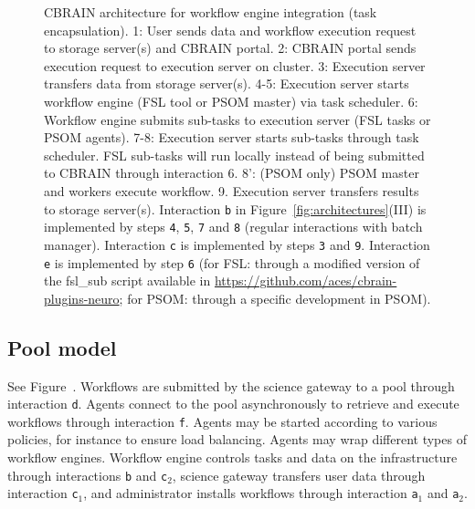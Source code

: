 \documentclass[preprint,3p,twocolumn]{elsarticle}
\begin{document}
\begin{figure}
\centering
{} \hfill {}
\caption{CBRAIN architecture for workflow engine integration
  (task encapsulation).  1: User sends data and workflow execution request to
  storage server(s) and CBRAIN portal. 2: CBRAIN portal sends
  execution request to execution server on cluster. 3: Execution
  server transfers data from storage server(s). 4-5: Execution server
  starts workflow engine (FSL tool or PSOM master) via task
  scheduler. 6: Workflow engine submits sub-tasks to execution server
  (FSL tasks or PSOM agents). 7-8: Execution server starts sub-tasks
  through task scheduler. FSL sub-tasks will run locally
  instead of being submitted to CBRAIN through interaction 6. 8':
  (PSOM only) PSOM master and workers execute workflow. 9. Execution
  server transfers results to storage server(s). Interaction
  \texttt{b} in Figure~\ref{fig:architectures}(III) is implemented by steps
  \texttt{4}, \texttt{5}, \texttt{7} and \texttt{8} (regular
  interactions with batch manager). Interaction \texttt{c} is
  implemented by steps \texttt{3} and \texttt{9}. Interaction
  \texttt{e} is implemented by step \texttt{6} (for FSL: through a
  modified version of the fsl\_sub script available in
  \url{https://github.com/aces/cbrain-plugins-neuro}; for PSOM:
  through a specific development in PSOM).}
\label{fig:cbrain-sub-tasking}
\end{figure}

\subsection{Pool model}
\label{sec:pool}
See Figure~. Workflows are submitted by the science
gateway to a pool through interaction \texttt{d}. Agents connect to
the pool asynchronously to retrieve and execute workflows through
interaction \texttt{f}. Agents may be started according to various
policies, for instance to ensure load balancing. Agents may wrap
different types of workflow engines. Workflow engine controls tasks
and data on the infrastructure through interactions \texttt{b} and
\texttt{c$_2$}, science gateway transfers user data through
interaction \texttt{c$_1$}, and administrator installs workflows
through interaction \texttt{a$_1$} and \texttt{a$_2$}.
\end{document}

